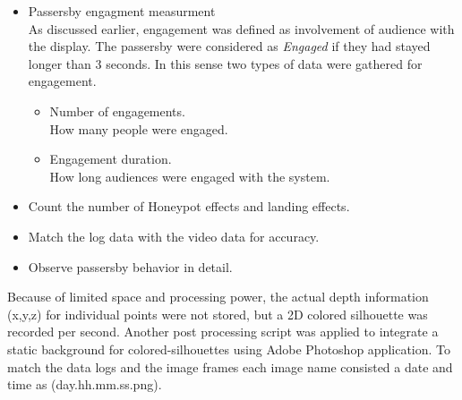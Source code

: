 \begin{enumerate}
\begin{itemize}

\item Passersby engagment measurment \\
As discussed earlier, engagement was defined as involvement of audience with the display. The passersby were considered as \emph{Engaged} if they had stayed longer than 3 seconds. In this sense two types of data were gathered for engagement.

        \begin{itemize}
        \item Number of engagements. \\
        How many people were engaged.

        \item Engagement duration. \\
        How long audiences were engaged with the system.

        \end{itemize}

\item Count the number of Honeypot effects and landing effects.
\item Match the log data with the video data for accuracy.
\item Observe passersby behavior in detail.
\end{itemize}

Because of limited space and processing power, the actual depth information (x,y,z) for individual points were not stored, but a 2D colored silhouette was recorded per second. Another post processing script was applied to integrate a static background for colored-silhouettes using Adobe Photoshop application. To match the data logs and the image frames each image name consisted a date and time as (day.hh.mm.ss.png).



\end{enumerate}

